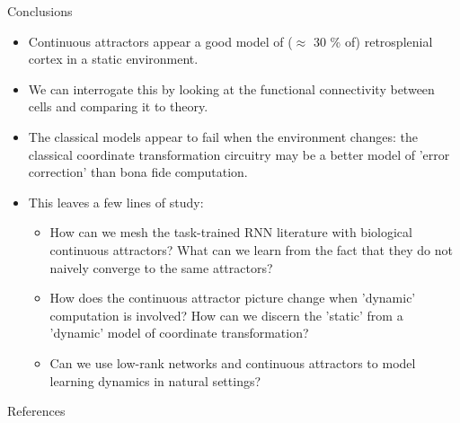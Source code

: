 \documentclass{beamer}
\begin{document}
\begin{frame}{Conclusions}

    \begin{itemize}
        \item<1-> Continuous attractors appear a good model of ($\approx$ 30 \% of) retrosplenial cortex in a static environment.
        \item<2-> We can interrogate this by looking at the functional connectivity between cells and comparing it to theory.
        \item<3-> The classical models appear to fail when the environment changes: the classical coordinate transformation circuitry may be a better model of 'error correction' than bona fide computation.
        \item<4-> This leaves a few lines of study:
        \begin{itemize}
            \item<5-> How can we mesh the task-trained RNN literature with biological continuous attractors? What can we learn from the fact that they do not naively converge to the same attractors?
            \item<6-> How does the continuous attractor picture change when 'dynamic' computation is involved? How can we discern the 'static' from a 'dynamic' model of coordinate transformation?
            \item<7-> Can we use low-rank networks and continuous attractors to model learning dynamics in natural settings?
        \end{itemize}
    \end{itemize}

\end{frame}

\nocite{*}
\begin{frame}[allowframebreaks]{References}
    \tiny
    \printbibliography[heading=none]
\end{frame}
\end{document}
